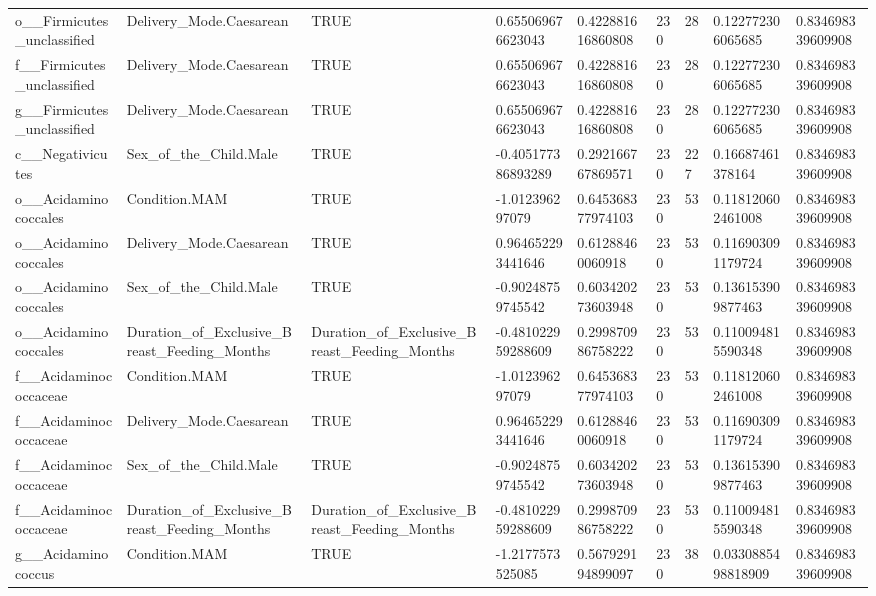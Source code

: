 \begin{longtable}{lllllllll}
o\_\_Firmicutes\_unclassified & Delivery\_Mode.Caesarean & TRUE & 0.655069676623043 & 0.422881616860808 & 230 & 28 & 0.122772306065685 & 0.834698339609908 \\
f\_\_Firmicutes\_unclassified & Delivery\_Mode.Caesarean & TRUE & 0.655069676623043 & 0.422881616860808 & 230 & 28 & 0.122772306065685 & 0.834698339609908 \\
g\_\_Firmicutes\_unclassified & Delivery\_Mode.Caesarean & TRUE & 0.655069676623043 & 0.422881616860808 & 230 & 28 & 0.122772306065685 & 0.834698339609908 \\
c\_\_Negativicutes & Sex\_of\_the\_Child.Male & TRUE & -0.405177386893289 & 0.292166767869571 & 230 & 227 & 0.16687461378164 & 0.834698339609908 \\
o\_\_Acidaminococcales & Condition.MAM & TRUE & -1.012396297079 & 0.645368377974103 & 230 & 53 & 0.118120602461008 & 0.834698339609908 \\
o\_\_Acidaminococcales & Delivery\_Mode.Caesarean & TRUE & 0.964652293441646 & 0.61288460060918 & 230 & 53 & 0.116903091179724 & 0.834698339609908 \\
o\_\_Acidaminococcales & Sex\_of\_the\_Child.Male & TRUE & -0.90248759745542 & 0.603420273603948 & 230 & 53 & 0.136153909877463 & 0.834698339609908 \\
o\_\_Acidaminococcales & Duration\_of\_Exclusive\_Breast\_Feeding\_Months & Duration\_of\_Exclusive\_Breast\_Feeding\_Months & -0.481022959288609 & 0.299870986758222 & 230 & 53 & 0.110094815590348 & 0.834698339609908 \\
f\_\_Acidaminococcaceae & Condition.MAM & TRUE & -1.012396297079 & 0.645368377974103 & 230 & 53 & 0.118120602461008 & 0.834698339609908 \\
f\_\_Acidaminococcaceae & Delivery\_Mode.Caesarean & TRUE & 0.964652293441646 & 0.61288460060918 & 230 & 53 & 0.116903091179724 & 0.834698339609908 \\
f\_\_Acidaminococcaceae & Sex\_of\_the\_Child.Male & TRUE & -0.90248759745542 & 0.603420273603948 & 230 & 53 & 0.136153909877463 & 0.834698339609908 \\
f\_\_Acidaminococcaceae & Duration\_of\_Exclusive\_Breast\_Feeding\_Months & Duration\_of\_Exclusive\_Breast\_Feeding\_Months & -0.481022959288609 & 0.299870986758222 & 230 & 53 & 0.110094815590348 & 0.834698339609908 \\
g\_\_Acidaminococcus & Condition.MAM & TRUE & -1.2177573525085 & 0.567929194899097 & 230 & 38 & 0.0330885498818909 & 0.834698339609908 \\

\end{longtable}
